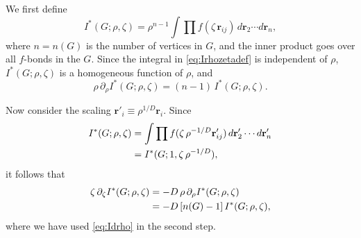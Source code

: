\documentclass[preprint]{revtex4-1}
\newcommand{\vct}[1]{\mathbf{#1}}
\providecommand{\vr}{} %
\renewcommand{\vr}{\vct{r}}
\begin{document}
We first define
\begin{equation}
  I^*(G; \rho, \zeta)
  = \rho^{n-1} \int \prod f(\zeta \, \vr_{ij}) \, d\vr_2 \cdots d\vr_n,
  \label{eq:Irhozetadef}
\end{equation}
where $n = n(G)$ is the number of vertices in $G$,
and the inner product goes over all $f$-bonds in the $G$.
Since the integral in \eqref{eq:Irhozetadef} is independent of $\rho$,
$I^*(G;\rho, \zeta)$ is a homogeneous function of $\rho$, and
%
\begin{equation}
  \rho \, \partial_\rho I^*(G; \rho, \zeta)
  = (n - 1) \, I^*(G; \rho, \zeta).
  \label{eq:Idrho}
\end{equation}



Now consider the scaling
$\vr'_i \equiv \rho^{1/D} \vr_i$.
Since
\begin{align*}
  I^*(G; \rho, \zeta)
&= \int \prod f(\zeta \, \rho^{-1/D} \vr'_{ij})
        \, d\vr'_2 \cdots d\vr'_n
  \notag \\
&= I^*(G; 1, \zeta \, \rho^{-1/D}),
\end{align*}
%
it follows that
\begin{align}
 \zeta \, \partial_\zeta I^*(G; \rho, \zeta)
&= -D \, \rho \, \partial_\rho I^*(G; \rho, \zeta) \notag \\
&= -D \, [n(G) - 1] \, I^*(G; \rho, \zeta),
\label{eq:drhodzeta}
\end{align}
where we have used \eqref{eq:Idrho} in the second step.
\end{document}

